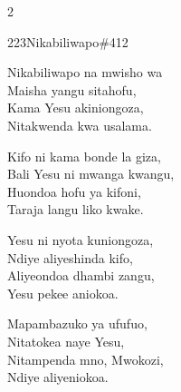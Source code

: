\begin{multicols}{2}
\begin{hymn}{223}{Nikabiliwapo}{\#412}
\begin{stanza}
Nikabiliwapo na mwisho wa\\
Maisha yangu sitahofu,\\
Kama Yesu akiniongoza,\\
Nitakwenda kwa usalama.
\end{stanza}
\begin{stanza}
Kifo ni kama bonde la giza,\\
Bali Yesu ni mwanga kwangu,\\
Huondoa hofu ya kifoni,\\
Taraja langu liko kwake.
\end{stanza}
\begin{stanza}
Yesu ni nyota kuniongoza,\\
Ndiye aliyeshinda kifo,\\
Aliyeondoa dhambi zangu,\\
Yesu pekee aniokoa.
\end{stanza}
\begin{stanza}
Mapambazuko ya ufufuo,\\
Nitatokea naye Yesu,\\
Nitampenda mno, Mwokozi,\\
Ndiye aliyeniokoa.
\end{stanza}
\end{hymn}


\end{multicols}
